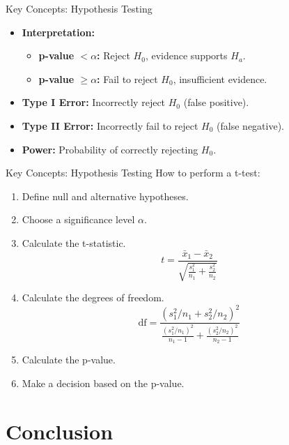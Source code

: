 \documentclass{beamer}
\begin{document}
\begin{frame}{Key Concepts: Hypothesis Testing}
\begin{itemize}
    \item \textbf{Interpretation:}
    \begin{itemize}
        \item \textbf{p-value $< \alpha$:} Reject $H_0$, evidence supports $H_a$.
        \item \textbf{p-value $\geq \alpha$:} Fail to reject $H_0$, insufficient evidence.
    \end{itemize}
    \item \textbf{Type I Error:} Incorrectly reject $H_0$ (false positive).
    \item \textbf{Type II Error:} Incorrectly fail to reject $H_0$ (false negative).
    \item \textbf{Power:} Probability of correctly rejecting $H_0$.
\end{itemize}
\end{frame}

\begin{frame}{Key Concepts: Hypothesis Testing}
How to perform a t-test:
\begin{enumerate}
    \item Define null and alternative hypotheses.
    \item Choose a significance level $\alpha$.
    \item Calculate the t-statistic.
    $$ t = \frac{\bar{x}_1 - \bar{x}_2}{\sqrt{\frac{s_1^2}{n_1} + \frac{s_2^2}{n_2}}} $$
    \item Calculate the degrees of freedom.
    $$ \text{df} = \frac{(s_1^2/n_1 + s_2^2/n_2)^2}{\frac{(s_1^2/n_1)^2}{n_1 - 1} + \frac{(s_2^2/n_2)^2}{n_2 - 1}} $$
    \item Calculate the p-value.
    \item Make a decision based on the p-value.
\end{enumerate}
\end{frame}

\section{Conclusion}
\end{document}
